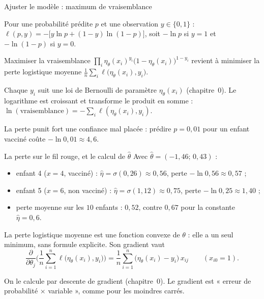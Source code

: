 \documentclass[aspectratio=169,11pt]{beamer}
\begin{document}
\begin{frame}{Ajuster le modèle : maximum de vraisemblance}
  \begin{definition}
    Pour une probabilité prédite $p$ et une observation $y\in\{0,1\}$ :
    $\ell(p,y)=-\big[y\ln p+(1-y)\ln(1-p)\big]$, soit $-\ln p$ si $y=1$ et $-\ln(1-p)$ si $y=0$.
  \end{definition}
  \begin{proposition}
    Maximiser la vraisemblance $\prod_i\eta_\theta(x_i)^{y_i}\big(1-\eta_\theta(x_i)\big)^{1-y_i}$ revient à minimiser la perte logistique moyenne
    $\frac1n\sum_i\ell\big(\eta_\theta(x_i),y_i\big)$.
  \end{proposition}
  \begin{preuve}
    Chaque $y_i$ suit une loi de Bernoulli de paramètre $\eta_\theta(x_i)$ (chapitre~0). Le logarithme est croissant et transforme le produit en somme : $\ln(\text{vraisemblance})=-\sum_i\ell(\eta_\theta(x_i),y_i)$.
  \end{preuve}
  {\small\color{cnfGris}La perte punit fort une confiance mal placée : prédire $p=0{,}01$ pour un enfant vacciné coûte $-\ln0{,}01\approx4{,}6$.}
\end{frame}

\begin{frame}{La perte sur le fil rouge, et le calcul de $\hat\theta$}
  \small
  Avec $\hat\theta=(-1{,}46;\,0{,}43)$ :
  \begin{itemize}
    \item enfant 4 ($x=4$, vacciné) : $\hat\eta=\sigma(0{,}26)\approx0{,}56$, perte $-\ln0{,}56\approx0{,}57$ ;
    \item enfant 5 ($x=6$, non vacciné) : $\hat\eta=\sigma(1{,}12)\approx0{,}75$, perte $-\ln0{,}25\approx1{,}40$ ;
    \item perte moyenne sur les $10$ enfants : $0{,}52$, contre $0{,}67$ pour la constante $\hat\eta=0{,}6$.
  \end{itemize}
  \vskip1mm
  \begin{proposition}[admise]
    La perte logistique moyenne est une fonction convexe de $\theta$ : elle a un seul minimum, sans formule explicite. Son gradient vaut
    \[
      \frac{\partial}{\partial\theta_j}\Big(\frac1n\sum_{i=1}^n\ell\big(\eta_\theta(x_i),y_i\big)\Big)=\frac1n\sum_{i=1}^n\big(\eta_\theta(x_i)-y_i\big)\,x_{ij}\qquad(x_{i0}=1).
    \]
  \end{proposition}
  {\small\color{cnfGris}On le calcule par descente de gradient (chapitre~0). Le gradient est « erreur de probabilité $\times$ variable », comme pour les moindres carrés.}
\end{frame}
\end{document}
